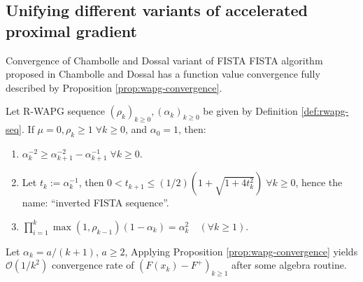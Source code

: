 \documentclass[11pt]{beamer}
\theoremstyle{definition}
\begin{document}
    \subsection{Unifying different variants of accelerated proximal gradient}
        \begin{frame}{Convergence of Chambolle and Dossal variant of FISTA}
            FISTA algorithm proposed in Chambolle and Dossal \cite{chambolle_convergence_2015} has a function value convergence fully described by Proposition \ref{prop:wapg-convergence}. 
            \begin{lemma}\label{lemma:inverted-fista-seq}
                Let R-WAPG sequence $(\rho_k)_{k \ge 0}, (\alpha_k)_{k \ge 0}$ be given by Definition \ref{def:rwapg-seq}.
                If $\mu = 0, \rho_k \ge 1\; \forall k \ge 0$, and $\alpha_0 = 1$, then:
                \begin{enumerate}
                    \item $\alpha_k^{-2} \ge \alpha_{k + 1}^{-2} - \alpha_{k + 1}^{-1}\; \forall k \ge 0$.
                    \item Let $t_k := \alpha_k^{-1}$, then $0 < t_{k + 1} \le (1/2)\left(1 + \sqrt{1 + 4t_k^2}\right)\;\forall k\ge 0$, hence the name: ``inverted FISTA sequence''.
                    \item $\prod_{i = 1}^k\max(1, \rho_{k - 1})(1 - \alpha_k) = \alpha_k^2 \quad (\forall k \ge 1)$.
                \end{enumerate}
            \end{lemma}
            Let $\alpha_k = a/(k + 1)$, $a \ge 2$, Applying Proposition \ref{prop:wapg-convergence} yields $\mathcal O(1/k^2)$ convergence rate of $(F(x_k) - F^+)_{k \ge 1}$ after some algebra routine. 
        \end{frame}
\end{document}

